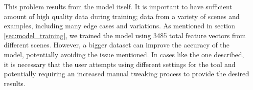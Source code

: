 This problem results from the model itself. It is important to have sufficient amount of high quality data during training; data from a variety of scenes and examples, including many edge cases and variations. As mentioned in section \ref{sec:model_training}, we trained the model using 3485 total feature vectors from different scenes. However, a bigger dataset can improve the accuracy of the model, potentially avoiding the issue mentioned. In cases like the one described, it is necessary that the user attempts using different settings for the tool and potentially requiring an increased manual tweaking process to provide the desired results.





